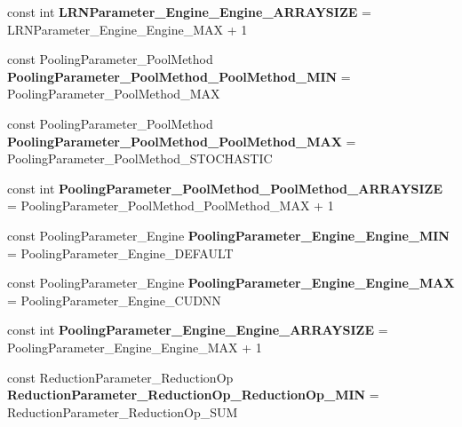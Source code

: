 \begin{DoxyCompactItemize}
const int {\bfseries L\+R\+N\+Parameter\+\_\+\+Engine\+\_\+\+Engine\+\_\+\+A\+R\+R\+A\+Y\+S\+I\+ZE} = L\+R\+N\+Parameter\+\_\+\+Engine\+\_\+\+Engine\+\_\+\+M\+AX + 1
\item 
\mbox{\label{namespacecaffe_a26e300d2aefe2c14ed1a45d76505b641}} 
const Pooling\+Parameter\+\_\+\+Pool\+Method {\bfseries Pooling\+Parameter\+\_\+\+Pool\+Method\+\_\+\+Pool\+Method\+\_\+\+M\+IN} = Pooling\+Parameter\+\_\+\+Pool\+Method\+\_\+\+M\+AX
\item 
\mbox{\label{namespacecaffe_a29f6849c1268e379cb0185b9130c29b6}} 
const Pooling\+Parameter\+\_\+\+Pool\+Method {\bfseries Pooling\+Parameter\+\_\+\+Pool\+Method\+\_\+\+Pool\+Method\+\_\+\+M\+AX} = Pooling\+Parameter\+\_\+\+Pool\+Method\+\_\+\+S\+T\+O\+C\+H\+A\+S\+T\+IC
\item 
\mbox{\label{namespacecaffe_a4d209021a0ac38375d9b6a5888eeedaa}} 
const int {\bfseries Pooling\+Parameter\+\_\+\+Pool\+Method\+\_\+\+Pool\+Method\+\_\+\+A\+R\+R\+A\+Y\+S\+I\+ZE} = Pooling\+Parameter\+\_\+\+Pool\+Method\+\_\+\+Pool\+Method\+\_\+\+M\+AX + 1
\item 
\mbox{\label{namespacecaffe_aafe77e70731f2cb8f45286984149820e}} 
const Pooling\+Parameter\+\_\+\+Engine {\bfseries Pooling\+Parameter\+\_\+\+Engine\+\_\+\+Engine\+\_\+\+M\+IN} = Pooling\+Parameter\+\_\+\+Engine\+\_\+\+D\+E\+F\+A\+U\+LT
\item 
\mbox{\label{namespacecaffe_a4b798df7005af9de01589ecea7171cf1}} 
const Pooling\+Parameter\+\_\+\+Engine {\bfseries Pooling\+Parameter\+\_\+\+Engine\+\_\+\+Engine\+\_\+\+M\+AX} = Pooling\+Parameter\+\_\+\+Engine\+\_\+\+C\+U\+D\+NN
\item 
\mbox{\label{namespacecaffe_a7d6e819cf610c683594fe3689dcef700}} 
const int {\bfseries Pooling\+Parameter\+\_\+\+Engine\+\_\+\+Engine\+\_\+\+A\+R\+R\+A\+Y\+S\+I\+ZE} = Pooling\+Parameter\+\_\+\+Engine\+\_\+\+Engine\+\_\+\+M\+AX + 1
\item 
\mbox{\label{namespacecaffe_a7d621f182ed516c39e172b7327b4359b}} 
const Reduction\+Parameter\+\_\+\+Reduction\+Op {\bfseries Reduction\+Parameter\+\_\+\+Reduction\+Op\+\_\+\+Reduction\+Op\+\_\+\+M\+IN} = Reduction\+Parameter\+\_\+\+Reduction\+Op\+\_\+\+S\+UM

\end{DoxyCompactItemize}
